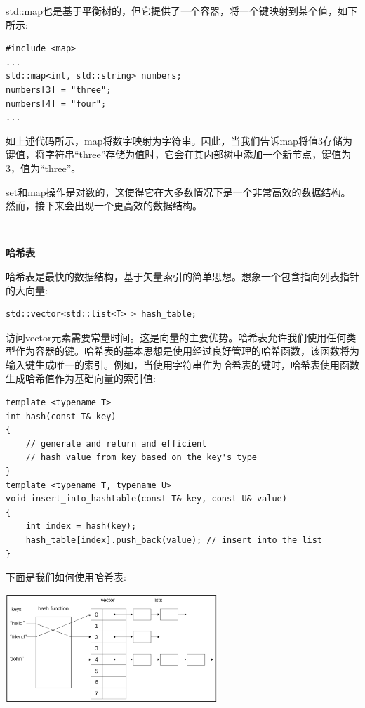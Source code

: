 std::map也是基于平衡树的，但它提供了一个容器，将一个键映射到某个值，如下所示: \par

\begin{lstlisting}[caption={}]
#include <map>
...
std::map<int, std::string> numbers;
numbers[3] = "three";
numbers[4] = "four";
...
\end{lstlisting}

如上述代码所示，map将数字映射为字符串。因此，当我们告诉map将值3存储为键值，将字符串“three”存储为值时，它会在其内部树中添加一个新节点，键值为3，值为“three”。 \par
set和map操作是对数的，这使得它在大多数情况下是一个非常高效的数据结构。然而，接下来会出现一个更高效的数据结构。 \par

\noindent\textbf{}\ \par
\textbf{哈希表} \ \par
哈希表是最快的数据结构，基于矢量索引的简单思想。想象一个包含指向列表指针的大向量: \par

\begin{lstlisting}[caption={}]
std::vector<std::list<T> > hash_table;
\end{lstlisting}

访问vector元素需要常量时间。这是向量的主要优势。哈希表允许我们使用任何类型作为容器的键。哈希表的基本思想是使用经过良好管理的哈希函数，该函数将为输入键生成唯一的索引。例如，当使用字符串作为哈希表的键时，哈希表使用函数生成哈希值作为基础向量的索引值: \par

\begin{lstlisting}[caption={}]
template <typename T>
int hash(const T& key)
{
	// generate and return and efficient
	// hash value from key based on the key's type
}
template <typename T, typename U>
void insert_into_hashtable(const T& key, const U& value)
{
	int index = hash(key);
	hash_table[index].push_back(value); // insert into the list
}
\end{lstlisting}

下面是我们如何使用哈希表: \par

\begin{center}
	\includegraphics[width=0.6\textwidth]{content/Section-2/Chapter-6/25}
\end{center}

